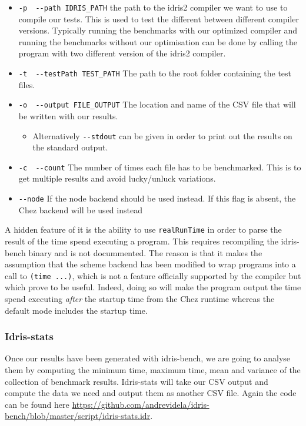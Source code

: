 \documentclass[
]{article}
\providecommand{\tightlist}{%
  \setlength{\itemsep}{0pt}\setlength{\parskip}{0pt}}
\begin{document}
\begin{itemize}
\tightlist
\item
  \texttt{-p\ \textbar{}\ -\/-path\ IDRIS\_PATH} the path to the idris2
  compiler we want to use to compile our tests. This is used to test the
  different between different compiler versions. Typically running the
  benchmarks with our optimized compiler and running the benchmarks
  without our optimisation can be done by calling the program with two
  different version of the idris2 compiler.
\item
  \texttt{-t\ \textbar{}\ -\/-testPath\ TEST\_PATH} The path to the root
  folder containing the test files.
\item
  \texttt{-o\ \textbar{}\ -\/-output\ FILE\_OUTPUT} The location and
  name of the CSV file that will be written with our results.

  \begin{itemize}
  \tightlist
  \item
    Alternatively \texttt{-\/-stdout} can be given in order to print out
    the results on the standard output.
  \end{itemize}
\item
  \texttt{-c\ \textbar{}\ -\/-count} The number of times each file has
  to be benchmarked. This is to get multiple results and avoid
  lucky/unluck variations.
\item
  \texttt{-\/-node} If the node backend should be used instead. If this
  flag is absent, the Chez backend will be used instead
\end{itemize}

A hidden feature of it is the ability to use \texttt{realRunTime} in
order to parse the result of the time spend executing a program. This
requires recompiling the idris-bench binary and is not docummented. The
reason is that it makes the assumption that the scheme backend has been
modified to wrap programs into a call to \texttt{(time\ ...)}, which is
not a feature officially supported by the compiler but which prove to be
useful. Indeed, doing so will make the program output the time spend
executing \emph{after} the startup time from the Chez runtime whereas
the default mode includes the startup time.

\hypertarget{idris-stats}{%
\subsubsection{Idris-stats}\label{idris-stats}}

Once our results have been generated with idris-bench, we are going to
analyse them by computing the minimum time, maximum time, mean and
variance of the collection of benchmark results. Idris-stats will take
our CSV output and compute the data we need and output them as another
CSV file. Again the code can be found here
\url{https://github.com/andrevidela/idris-bench/blob/master/script/idris-stats.idr}.
\end{document}
